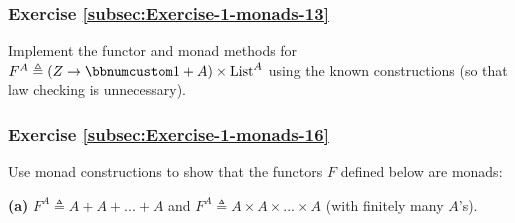 \begin{comment}
Solution:

The second possible definition, $\text{pu}_{L}\triangleq a\rightarrow\bbnum 0+\text{pu}_{F}(a)$,
violates the right identity law:
\begin{align*}
 & \text{pu}_{L}^{\uparrow L}\bef\text{ftn}_{L}=\,\begin{array}{|c||ccc|}
 & A & F^{A} & F^{L^{A}}\\
\hline A & \bbnum 0 & \text{pu}_{F} & \bbnum 0\\
F^{A} & \bbnum 0 & \bbnum 0 & \text{pu}_{L}^{\uparrow F}
\end{array}\,\bef\,\begin{array}{|c||cc|}
 & A & F^{A}\\
\hline A & \text{id} & \bbnum 0\\
F^{A} & \bbnum 0 & \text{id}\\
F^{L^{A}} & \bbnum 0 & \gamma^{\uparrow F}\bef\text{ftn}_{F}
\end{array}\,=\,\begin{array}{|c||cc|}
 & A & F^{A}\\
\hline A & \bbnum 0 & \text{pu}_{F}\\
F^{A} & \bbnum 0 & ...
\end{array}\,\neq\text{id}\quad.
\end{align*}
This matrix cannot be equal to the identity function because it has
a missing diagonal element.
\end{comment}


\subsubsection{Exercise \label{subsec:Exercise-1-monads-13}\ref{subsec:Exercise-1-monads-13}}

Implement the functor and monad methods for $F^{A}\triangleq\left(Z\rightarrow\bbnum 1+A\right)\times\text{List}^{A}$
using the known constructions (so that law checking is unnecessary).

\subsubsection{Exercise \label{subsec:Exercise-1-monads-16}\ref{subsec:Exercise-1-monads-16}}

Use monad constructions to show that the functors $F$ defined below
are monads:

\textbf{(a)} $F^{A}\triangleq A+A+...+A$ and $F^{A}\triangleq A\times A\times...\times A$
(with finitely many $A$\textsf{'}s).

